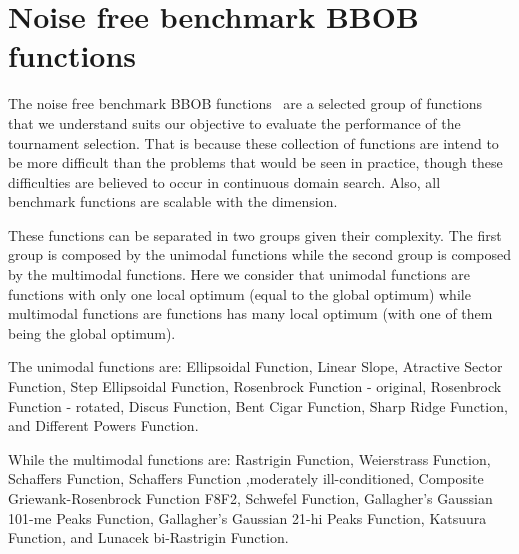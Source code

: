 \section{Noise free benchmark BBOB functions}

The noise free benchmark BBOB functions~\cite{hansen2010real} are a selected group of functions that we understand suits our objective to evaluate the performance of the tournament selection. That is because these collection of functions are intend to be more difficult than the problems that would be seen in practice, though these difficulties are believed to occur in continuous domain search. Also, all benchmark functions are scalable with the dimension. 


These functions can be separated in two groups given their complexity. The first group is composed by the unimodal functions while the second group is composed by the multimodal functions. Here we consider that unimodal functions are functions with only one local optimum (equal to the global optimum) while multimodal functions are functions has many local optimum (with one of them being the global optimum). 

The unimodal functions are: Ellipsoidal Function, Linear Slope, Atractive Sector Function,  Step Ellipsoidal Function, Rosenbrock Function - original, Rosenbrock Function - rotated, Discus Function, Bent Cigar Function, Sharp Ridge Function, and Different Powers Function.

While the multimodal functions are: Rastrigin Function, Weierstrass Function, Schaffers Function, Schaffers Function ,moderately ill-conditioned, Composite Griewank-Rosenbrock Function F8F2, Schwefel Function, Gallagher's Gaussian 101-me Peaks Function, Gallagher's Gaussian 21-hi Peaks Function, Katsuura Function, and Lunacek bi-Rastrigin Function.